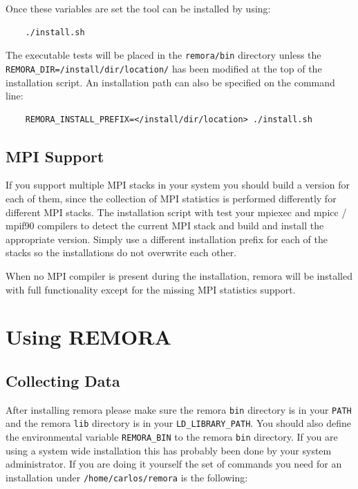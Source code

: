 \documentclass[10pt,a4paper]{report}
\begin{document}
Once these variables are set the tool can be installed by using:

\begin{verbatim}
    ./install.sh
\end{verbatim}

The executable tests will be placed in the \verb+remora/bin+ directory unless the \verb+REMORA_DIR=/install/dir/location/+ has been modified at the top of the installation script. An installation path can also be specified on the command line:

\begin{verbatim}
    REMORA_INSTALL_PREFIX=</install/dir/location> ./install.sh
\end{verbatim}

\section{MPI Support}
If you support multiple MPI stacks in your system you should build a version for each of them, since the collection of MPI statistics is performed differently for different MPI stacks. The installation script with test your mpiexec and mpicc / mpif90 compilers to detect the current MPI stack and build and install the appropriate version. Simply use a different installation prefix for each of the stacks so the installations do not overwrite each other. 

When no MPI compiler is present during the installation, remora will be installed with full functionality except for the missing MPI statistics support.

\FloatBarrier
\chapter{Using REMORA}

\section{Collecting Data}
After installing remora please make sure the remora \verb+bin+ directory is in your \verb+PATH+ and the remora \verb+lib+ directory is in your \verb|LD_LIBRARY_PATH|. You should also define the environmental variable \verb+REMORA_BIN+ to the remora \verb+bin+ directory. If you are using a system wide installation this has probably been done by your system administrator. If you are doing it yourself the set of commands you need for an installation under \verb+/home/carlos/remora+ is the following:
\end{document}
